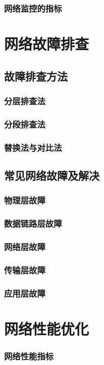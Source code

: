\documentclass{book}
\begin{document}
\subsubsection{网络监控的指标}
\section{网络故障排查}
\subsection{故障排查方法}
\subsubsection{分层排查法}
\subsubsection{分段排查法}
\subsubsection{替换法与对比法}
\subsection{常见网络故障及解决}
\subsubsection{物理层故障}
\subsubsection{数据链路层故障}
\subsubsection{网络层故障}
\subsubsection{传输层故障}
\subsubsection{应用层故障}
\section{网络性能优化}
\subsubsection{网络性能指标}
\end{document}

